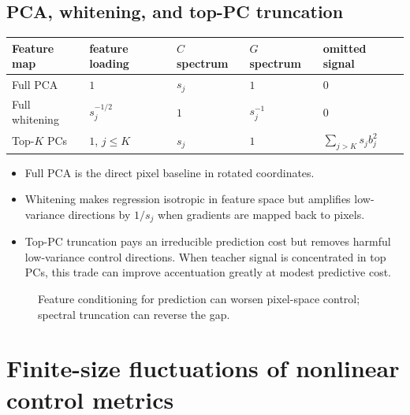 \documentclass[11pt]{article}
\begin{document}
\subsection{PCA, whitening, and top-PC truncation}

\begin{center}
\begin{tabular}{@{}lllll@{}}
\toprule
Feature map & feature loading & $C$ spectrum & $G$ spectrum & omitted signal\\
\midrule
Full PCA & $1$ & $s_j$ & $1$ & $0$\\
Full whitening & $s_j^{-1/2}$ & $1$ & $s_j^{-1}$ & $0$\\
Top-$K$ PCs & $1$, $j\le K$ & $s_j$ & $1$ & $\sum_{j>K}s_jb_j^2$\\
\bottomrule
\end{tabular}
\end{center}

\begin{itemize}
  \item Full PCA is the direct pixel baseline in rotated coordinates.
  \item Whitening makes regression isotropic in feature space but amplifies
        low-variance directions by $1/s_j$ when gradients are mapped back to
        pixels.
  \item Top-PC truncation pays an irreducible prediction cost but removes
        harmful low-variance control directions. When teacher signal is
        concentrated in top PCs, this trade can improve accentuation greatly
        at modest predictive cost.
\end{itemize}

\begin{figure}[t]
  \centering
  \caption{Feature conditioning for prediction can worsen pixel-space control;
  spectral truncation can reverse the gap.}
  \label{fig:feature-comparison}
\end{figure}

\section{Finite-size fluctuations of nonlinear control metrics}
\label{sec:distributional-de}
\end{document}
